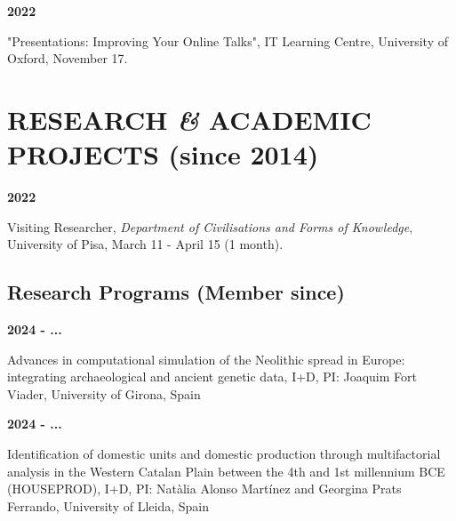 \documentclass{article}
\newcommand{\fr}[1]{} %
\newcommand{\en}[1]{#1}   %
\begin{document}
\textbf{2022 }
\fr{"Presentations: Improving your online talks", IT Learning Centre, University of Oxford, 17 Novembre.}
\en{"Presentations: Improving Your Online Talks", IT Learning Centre, University of Oxford, November 17.}
\smallbreak


\section{\fr{PROJETS DE RECHERCHE \textit{\&} ACADÉMIQUES (depuis 2014)}\en{RESEARCH \textit{\&} ACADEMIC PROJECTS (since 2014)}}

\textbf{2022}
\fr{Chercheur invité, \textit{Dipartimento di Civiltà e forme del Sapere}, Università di Pisa, 11 mars - 15 avril (1 mois).}
\en{Visiting Researcher, \textit{Department of Civilisations and Forms of Knowledge}, University of Pisa, March 11 - April 15 (1 month).}

\smallbreak

\subsection*{\fr{Programmes de recherche (Membre depuis)}\en{Research Programs (Member since)}}

\textbf{2024 - ...}
\fr{Advances in computational simulation of the Neolithic spread in Europe: integrating archaeological and ancient genetic data, I+D, PI: Joaquim Fort Viader, Universitat de Girona, Spain}
\en{Advances in computational simulation of the Neolithic spread in Europe: integrating archaeological and ancient genetic data, I+D, PI: Joaquim Fort Viader, University of Girona, Spain}

\textbf{2024 - ...}
\fr{Identificación de unidades domésticas y de producción doméstica a través de análisis multifactoriales en la Llanura Occidental Catalana entre el IV y el I milenio ANE (HOUSEPROD), I+D, PI: Natàlia Alonso Martínez et Georgina Prats Ferrando, Universitat de Lleida, Spain}
\en{Identification of domestic units and domestic production through multifactorial analysis in the Western Catalan Plain between the 4th and 1st millennium BCE (HOUSEPROD), I+D, PI: Natàlia Alonso Martínez and Georgina Prats Ferrando, University of Lleida, Spain}
\end{document}
